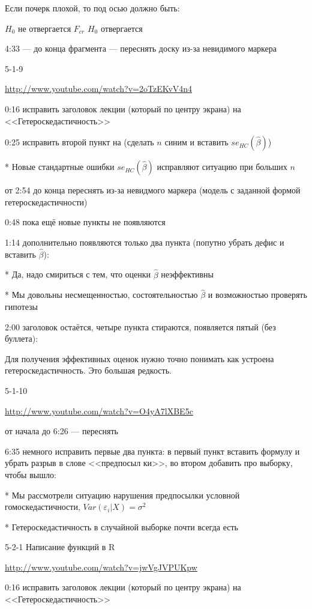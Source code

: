 \documentclass[12pt,a4paper]{article}
\newcommand{\e}{\varepsilon}
\renewcommand{\b}{\beta}
\newcommand{\hb}{\hat{\b}}
\begin{document}
Если почерк плохой, то под осью должно быть:

$H_0$ не отвергается  \hspace{1cm} $F_{cr}$ \hspace{1cm} $H_0$  отвергается 

4:33 --- до конца фрагмента --- переснять доску из-за невидимого маркера

5-1-9 

\url{http://www.youtube.com/watch?v=2oTzEKvV4n4}

0:16 исправить заголовок лекции (который по центру экрана) на <<Гетероскедастичность>>

0:25 исправить второй пункт на (сделать $n$ синим и вставить $se_{HC}(\hb)$)

* Новые стандартные ошибки $se_{HC}(\hb)$ исправляют ситуацию при больших $n$

от 2:54 до конца переснять из-за невидмого маркера (модель с заданной формой гетероскедастичности)

0:48 пока ещё новые пункты не появляются

1:14 дополнительно появляются только два пункта (попутно убрать дефис и вставить $\hb$):

* Да, надо смириться с тем, что оценки $\hb$ неэффективны

* Мы довольны несмещенностью, состоятельностью $\hb$ и возможностью проверять гипотезы

2:00 заголовок остаётся, четыре пункта стираются, появляется пятый (без буллета):

Для получения эффективных оценок нужно точно понимать как устроена гетероскедастичность. Это большая редкость.

5-1-10 

\url{http://www.youtube.com/watch?v=O4yA7lXBE5c}

от начала до 6:26  --- переснять

6:35  немного исправить первые два пункта: в первый пункт вставить формулу и убрать разрыв в слове <<предпосыл ки>>, во втором добавить про выборку, чтобы вышло:

* Мы рассмотрели ситуацию нарушения предпосылки условной гомоскедастичности, $Var(\e_i|X)=\sigma^2$ 

* Гетероскедастичность в случайной выборке почти всегда есть

5-2-1 Написание функций в R

\url{http://www.youtube.com/watch?v=jwVgJVPUKpw}

0:16 исправить заголовок лекции (который по центру экрана) на <<Гетероскедастичность>>
\end{document}
